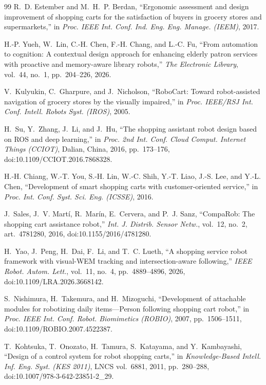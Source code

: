 \documentclass[conference]{IEEEtran}
\begin{document}
\begin{thebibliography}{99}
R.~D. Estember and M.~H.~P. Berdan, ``Ergonomic assessment and design improvement of shopping carts for the satisfaction of buyers in grocery stores and supermarkets,'' in \emph{Proc. IEEE Int. Conf. Ind. Eng. Eng. Manage. (IEEM)}, 2017.

H.-P. Yueh, W.~Lin, C.-H. Chen, F.-H. Chang, and L.-C. Fu, ``From automation to cognition: A contextual design approach for enhancing elderly patron services with proactive and memory-aware library robots,'' \emph{The Electronic Library}, vol.~44, no.~1, pp.~204--226, 2026.

V.~Kulyukin, C.~Gharpure, and J.~Nicholson, ``RoboCart: Toward robot-assisted navigation of grocery stores by the visually impaired,'' in \emph{Proc. IEEE/RSJ Int. Conf. Intell. Robots Syst. (IROS)}, 2005.

H.~Su, Y.~Zhang, J.~Li, and J.~Hu, ``The shopping assistant robot design based on ROS and deep learning,'' in \emph{Proc. 2nd Int. Conf. Cloud Comput. Internet Things (CCIOT)}, Dalian, China, 2016, pp.~173--176, doi:10.1109/CCIOT.2016.7868328.

H.-H. Chiang, W.-T. You, S.-H. Lin, W.-C. Shih, Y.-T. Liao, J.-S. Lee, and Y.-L. Chen, ``Development of smart shopping carts with customer-oriented service,'' in \emph{Proc. Int. Conf. Syst. Sci. Eng. (ICSSE)}, 2016.

J.~Sales, J.~V. Mart\'i, R.~Mar\'in, E.~Cervera, and P.~J. Sanz, ``CompaRob: The shopping cart assistance robot,'' \emph{Int. J. Distrib. Sensor Netw.}, vol.~12, no.~2, art.~4781280, 2016, doi:10.1155/2016/4781280.

H.~Yao, J.~Peng, H.~Dai, F.~Li, and T.~C. Lueth, ``A shopping service robot framework with visual-WEM tracking and intersection-aware following,'' \emph{IEEE Robot. Autom. Lett.}, vol.~11, no.~4, pp.~4889--4896, 2026, doi:10.1109/LRA.2026.3668142.

S.~Nishimura, H.~Takemura, and H.~Mizoguchi, ``Development of attachable modules for robotizing daily items---Person following shopping cart robot,'' in \emph{Proc. IEEE Int. Conf. Robot. Biomimetics (ROBIO)}, 2007, pp.~1506--1511, doi:10.1109/ROBIO.2007.4522387.

T.~Kohtsuka, T.~Onozato, H.~Tamura, S.~Katayama, and Y.~Kambayashi, ``Design of a control system for robot shopping carts,'' in \emph{Knowledge-Based Intell. Inf. Eng. Syst. (KES 2011)}, LNCS vol.~6881, 2011, pp.~280--288, doi:10.1007/978-3-642-23851-2\_29.


\end{thebibliography}
\end{document}

